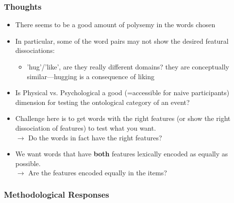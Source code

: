 \documentclass[12pt,letterpaper,table,svgnames,dvipsnames]{article}
\begin{document}
\subsubsection{Thoughts}
\begin{itemize}
    \item There seems to be a good amount of polysemy in the words chosen
    
    \item In particular, some of the word pairs may not show the desired featural dissociations: 
        \begin{itemize}
             \item 'hug'/'like', are they really different domains? they are conceptually similar---hugging is a consequence of liking
        \end{itemize}

    \item Is Physical vs. Psychological a good (=accessible for naive participants) dimension for testing the ontological category of an event? 
    
    \item Challenge here is to get words with the right features (or show the right dissociation of features) to test what you want.\\
    $\rightarrow$ Do the words in fact have the right features?

    \item We want words that have \textbf{both} features lexically encoded as equally as possible.\\
    $\rightarrow$ Are the features encoded equally in the items?


\end{itemize}


\subsubsection{Methodological Responses}
\end{document}
